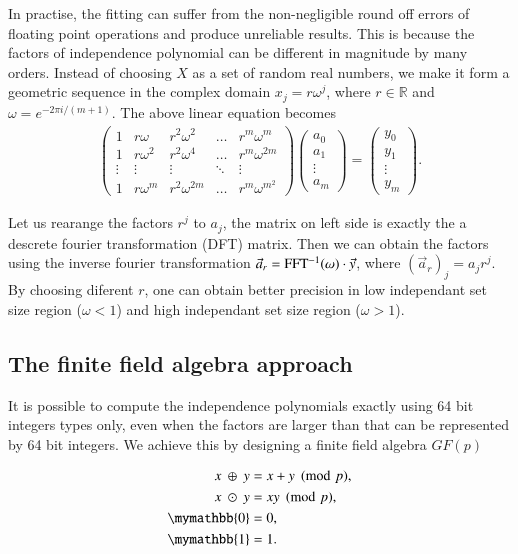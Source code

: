 \documentclass{article}
\newcommand{\<}{\langle}
\renewcommand{\>}{\rangle}
\theoremstyle{definition}\newtheorem{definition}{\textit{Definition}}
\begin{document}
In practise, the fitting can suffer from the non-negligible round off errors of floating point operations and produce unreliable results.
This is because the factors of independence polynomial can be different in magnitude by many orders.
Instead of choosing $X$ as a set of random real numbers, we make it form a geometric sequence in the complex domain $x_j = r\omega^j$, where $r \in \mathbb{R}$ and $\omega = e^{-2\pi i/(m+1)}$. The above linear equation becomes
\begin{align}
\left(\begin{matrix}
1 & r\omega & r^2\omega^2 & \ldots & r^m\omega^m \\
1 & r\omega^2 & r^2\omega^4 & \ldots & r^m\omega^{2m} \\
\vdots & \vdots & \vdots &\ddots & \vdots \\
1 & r\omega^m & r^2\omega^{2m} & \ldots & r^m\omega^{m^2}
\end{matrix}\right)
\left(\begin{matrix}
a_0 \\ a_1 \\ \vdots \\ a_m
\end{matrix}\right)
= \left(\begin{matrix}
y_0 \\ y_1 \\ \vdots \\ y_m
\end{matrix}\right).
\end{align}

Let us rearange the factors $r^j$ to $a_j$, the matrix on left side is exactly the a descrete fourier transformation (DFT) matrix.
Then we can obtain the factors using the inverse fourier transformation $\vec a_r = {\rm FFT^{-1}}(\omega) \cdot \vec y$, where $(\vec a_r)_j = a_j r ^j$.
By choosing diferent $r$, one can obtain better precision in low independant set size region  ($\omega<1$) and high independant set size region ($\omega>1$).

\subsection{The finite field algebra approach}
It is possible to compute the independence polynomials exactly using 64 bit integers types only,
even when the factors are larger than that can be represented by 64 bit integers.
We achieve this by designing a finite field algebra $GF(p)$

\begin{align}
\begin{split}
    x ~\oplus~ y &= x+y\pmod p,\\
    x ~\odot~ y &= xy\pmod p,\\
    \mymathbb{0} &= 0,\\
    \mymathbb{1} &= 1.
\end{split}
\end{align}
\end{document}
